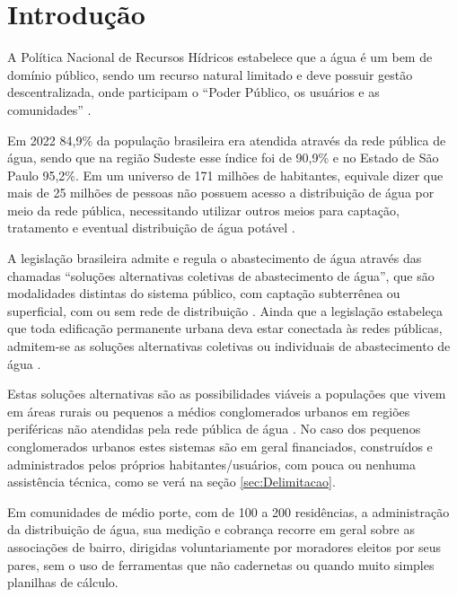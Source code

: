 
\chapter{Introdução}\label{chap:Introducao}

A Política Nacional de Recursos Hídricos estabelece que a água é um bem de domínio público, sendo um recurso natural limitado e deve possuir gestão descentralizada, onde participam o ``Poder Público, os usuários e as comunidades'' \cite{LeiPolNacRecHidricos}.

Em 2022 84,9\% da população brasileira era atendida através da rede pública de água, sendo que na região Sudeste esse índice foi de 90,9\% e no Estado de São Paulo 95,2\%. Em um universo de 171 milhões de habitantes, equivale dizer que mais de 25 milhões de pessoas não possuem acesso a distribuição de água por meio da rede pública, necessitando utilizar outros meios para captação, tratamento e eventual distribuição de água potável \cite{MCID_DiagTem2023}.

A legislação brasileira admite e regula o abastecimento de água através das chamadas ``soluções alternativas coletivas de abastecimento de água'', que são modalidades distintas do sistema público, com captação subterrênea ou superficial, com ou sem rede de distribuição \cite{PortCons5}. Ainda que a legislação estabeleça que toda edificação permanente urbana deva estar conectada às redes públicas, admitem-se as soluções alternativas coletivas ou individuais de abastecimento de água \cite{LeiSaneamento}.

Estas soluções alternativas são as possibilidades viáveis a populações que vivem em áreas rurais ou pequenos a médios conglomerados urbanos em regiões periféricas não atendidas pela rede pública de água \cite{ManualSaneamento,AbastAguaPotavel}. No caso dos pequenos conglomerados urbanos estes sistemas são em geral financiados, construídos e administrados pelos próprios habitantes/usuários, com pouca ou nenhuma assistência técnica, como se verá na seção \ref{sec:Delimitacao}.

Em comunidades de médio porte, com de 100 a 200 residências, a administração da distribuição de água, sua medição e cobrança recorre em geral sobre as associações de bairro, dirigidas voluntariamente por moradores eleitos por seus pares, sem o uso de ferramentas que não cadernetas ou quando muito simples planilhas de cálculo.




